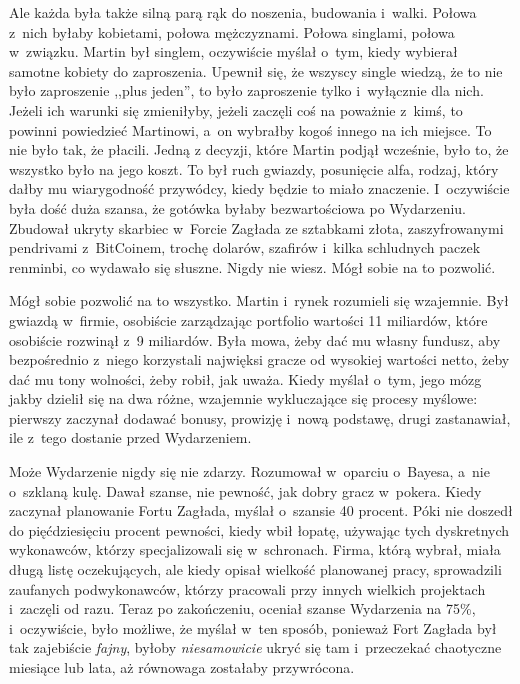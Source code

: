 \documentclass[oneside,polish,11pt,sfheadings]{mwbk}
\begin{document}
Ale każda była także silną parą rąk do noszenia, budowania i~walki.
Połowa z~nich byłaby kobietami, połowa mężczyznami. Połowa singlami,
połowa w~związku. Martin był singlem, oczywiście myślał o~tym, kiedy
wybierał samotne kobiety do zaproszenia. Upewnił się, że wszyscy single
wiedzą, że to nie było zaproszenie ,,plus jeden'', to było zaproszenie
tylko i~wyłącznie dla nich. Jeżeli ich warunki się zmieniłyby, jeżeli
zaczęli coś na poważnie z~kimś, to powinni powiedzieć Martinowi, a~on
wybrałby kogoś innego na ich miejsce. To nie było tak, że płacili. Jedną
z decyzji, które Martin podjął wcześnie, było to, że wszystko było na
jego koszt. To był ruch gwiazdy, posunięcie alfa, rodzaj, który dałby mu
wiarygodność przywódcy, kiedy będzie to miało znaczenie. I~oczywiście
była dość duża szansa, że gotówka byłaby bezwartościowa po Wydarzeniu.
Zbudował ukryty skarbiec w~Forcie Zagłada ze sztabkami złota,
zaszyfrowanymi pendrivami z~BitCoinem, trochę dolarów, szafirów i~kilka
schludnych paczek renminbi, co wydawało się słuszne. Nigdy nie wiesz.
Mógł sobie na to pozwolić.

Mógł sobie pozwolić na to wszystko. Martin i~rynek rozumieli się
wzajemnie. Był gwiazdą w~firmie, osobiście zarządzając portfolio
wartości 11 miliardów, które osobiście rozwinął z~9 miliardów. Była
mowa, żeby dać mu własny fundusz, aby bezpośrednio z~niego korzystali
najwięksi gracze od wysokiej wartości netto, żeby dać mu tony wolności,
żeby robił, jak uważa. Kiedy myślał o~tym, jego mózg jakby dzielił się
na dwa różne, wzajemnie wykluczające się procesy myślowe: pierwszy
zaczynał dodawać bonusy, prowizję i~nową podstawę, drugi zastanawiał,
ile z~tego dostanie przed Wydarzeniem.

Może Wydarzenie nigdy się nie zdarzy. Rozumował w~oparciu o~Bayesa, a~nie o~szklaną kulę. Dawał szanse, nie pewność, jak dobry gracz w~pokera.
Kiedy zaczynał planowanie Fortu Zagłada, myślał o~szansie 40 procent.
Póki nie doszedł do pięćdziesięciu procent pewności, kiedy wbił łopatę,
używając tych dyskretnych wykonawców, którzy specjalizowali się w~schronach. Firma, którą wybrał, miała długą listę oczekujących, ale
kiedy opisał wielkość planowanej pracy, sprowadzili zaufanych
podwykonawców, którzy pracowali przy innych wielkich projektach i~zaczęli od razu. Teraz po zakończeniu, oceniał szanse Wydarzenia na
75\%, i~oczywiście, było możliwe, że myślał w~ten sposób, ponieważ Fort
Zagłada był tak zajebiście \textit{fajny}, byłoby \textit{niesamowicie}
ukryć się tam i~przeczekać chaotyczne miesiące lub lata, aż równowaga
zostałaby przywrócona.
\end{document}
